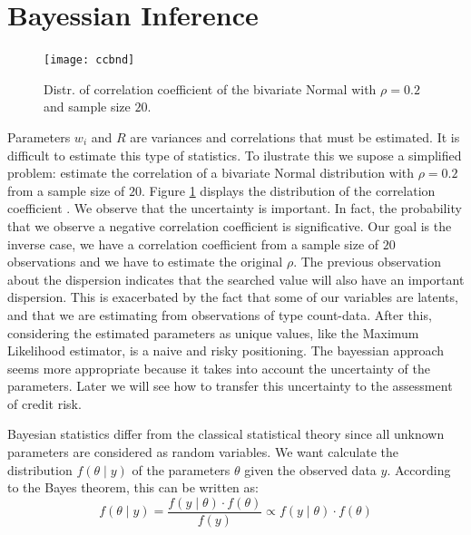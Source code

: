 \documentclass[11pt,fleqn]{book} %
\begin{document}
\section{Bayessian Inference}

\begin{figure}
\vspace{-20pt}
\begin{center}
\texttt{[image: ccbnd]}
\end{center}
\vspace{-10pt}
\caption{Distr. of correlation coefficient of the bivariate Normal with $\rho=0.2$ and sample size $20$.}
\vspace{-10pt}
\label{fig:ccbnd}
\end{figure}
Parameters $w_i$ and $R$ are variances and correlations that must be 
estimated. It is difficult to estimate this type of statistics. To ilustrate
this we supose a simplified problem: estimate the correlation of a bivariate 
Normal distribution with $\rho=0.2$ from a sample size of $20$. Figure 
\ref{fig:ccbnd} displays the distribution of the correlation 
coefficient \cite[pp. 217-221]{kenney:1951}. We observe that the 
uncertainty is important. In fact, the probability that we observe 
a negative correlation coefficient is significative. Our goal
is the inverse case, we have a correlation coefficient from a sample
size of $20$ observations and we have to estimate the original $\rho$.
The previous observation about the dispersion indicates that the 
searched value will also have an important dispersion.
This is exacerbated by the fact that some of our variables
are latents, and that we are estimating from observations of type
count-data. After this, considering the estimated parameters as 
unique values, like the Maximum Likelihood estimator, is a naive and 
risky positioning. The bayessian approach seems  more appropriate 
\cite{gossl:2005} \cite{tarashev:2010} because it takes into account 
the uncertainty of the parameters. Later we will see how to transfer 
this uncertainty to the assessment of credit risk.

Bayesian statistics differ from the classical statistical 
theory since all unknown parameters are considered as random 
variables. We want calculate the distribution $f(\theta \mid y)$ 
of the parameters $\theta$ given the observed data $y$. 
According to the Bayes theorem, this can be written as:
\begin{displaymath}
	f(\theta \mid y) = \frac{f(y \mid \theta) \cdot f(\theta)}{f(y)} \propto f(y \mid \theta) \cdot f(\theta)
\end{displaymath}
\end{document}
